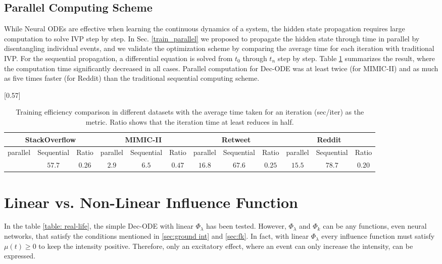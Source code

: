 \subsection{Parallel Computing Scheme \label{ablation: parallel}}
While Neural ODEs are effective when learning the continuous dynamics of a system, the hidden state propagation requires large computation to solve IVP step by step. 
In Sec. \ref{train_parallel} we proposed to propagate the hidden state through time in parallel by disentangling individual events, 
and we validate the optimization scheme by comparing the average time for each iteration with traditional IVP. 
For the sequential propagation, a differential equation is solved from $t_0$ through $t_n$ step by step.
Table \ref{tab:parallel} summarizes the result, where the computation time significantly decreased in all cases.
Parallel computation for Dec-ODE was at least twice (for MIMIC-II) and as much as five times faster (for Reddit) than the traditional sequential computing scheme. 

\begin{table}[h]
\renewcommand{\arraystretch}{1.1}
\centering
\caption{Training efficiency comparison in different datasets with the average time taken for an iteration (sec/iter) as the metric. Ratio shows that the iteration time at least reduces in half.}
\scalebox{0.57}[0.57]{
\begin{tabular}{cc |c| cc|c | c c|c | cc|c } 
\multicolumn{3}{c|}{StackOverflow} & \multicolumn{3}{c|}{MIMIC-II} & \multicolumn{3}{c|}{Retweet} & \multicolumn{3}{c}{Reddit}\\[-2pt]
\hline
parallel &Sequential& Ratio &  parallel& Sequential&Ratio &  parallel&Sequential&Ratio &  parallel&Sequential&Ratio\\
\hline
\multirow{1}{*}{} $15.0$ & $57.7$ &0.26 & $2.9$ & $6.5$ & $0.47$ & $16.8$ & $67.6$ &$0.25$ & $15.5$ & $78.7$ & $0.20$ \\
   
\end{tabular}
}
\label{tab:parallel}
\end{table}




\section{Linear vs. Non-Linear Influence Function\label{lin-nonlin}}
In the table \ref{table: real-life}, the simple Dec-ODE with linear $\Phi_\lambda$ has been tested.
However, $\Phi_\lambda$ and $\Phi_k$ can be any functions, even neural networks, that satisfy the conditions mentioned in \ref{sec:ground int} and \ref{sec:fk}.
In fact, with linear $\Phi_\lambda$ every influence function must satisfy $\mu(t) \ge 0$ to keep the intensity positive.
Therefore, only an excitatory effect, where an event can only increase the intensity, can be expressed.

